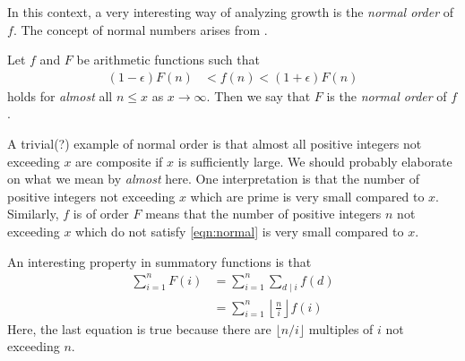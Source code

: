 \documentclass[elemannt.tex]{subfile}
\begin{document}
	In this context, a very interesting way of analyzing growth is the \textit{normal order} of $f$. The concept of normal numbers arises from \textcite{hardy_aiyangar_1917}.
		\begin{definition}
			Let $f$ and $F$ be arithmetic functions such that
				\begin{align}
					(1-\epsilon)F(n)
						& < f(n)<(1+\epsilon)F(n)\label{eqn:normal}
				\end{align}
			holds for \textit{almost} all $n\leq x$ as $x\to\infty$. Then we say that $F$ is the \textit{normal order} of $f$.
		\end{definition}
	A trivial(?) example of normal order is that almost all positive integers not exceeding $x$ are composite if $x$ is sufficiently large. We should probably elaborate on what we mean by \textit{almost} here. One interpretation is that the number of positive integers not exceeding $x$ which are prime is very small compared to $x$. Similarly, $f$ is of order $F$ means that the number of positive integers $n$ not exceeding $x$ which do not satisfy \ref{eqn:normal} is very small compared to $x$.

	An interesting property in summatory functions is that
		\begin{align*}
			\sum_{i=1}^{n}F(i)
				& = \sum_{i=1}^{n}\sum_{d\mid i}f(d)\\
				& = \sum_{i=1}^{n}\left\lfloor{\frac{n}{i}}\right\rfloor f(i)
		\end{align*}
	Here, the last equation is true because there are $\lfloor{n/i}\rfloor$ multiples of $i$ not exceeding $n$.
\end{document}
